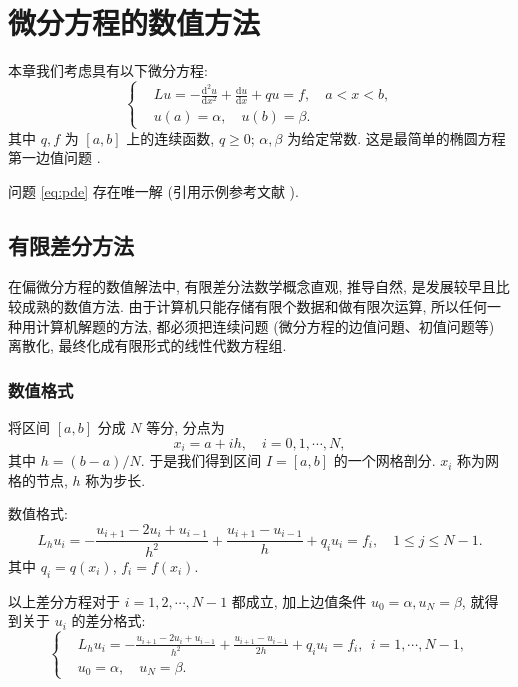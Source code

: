 

\chapter{微分方程的数值方法}

本章我们考虑具有以下微分方程:
\begin{equation}\label{eq:pde}
\left\{\begin{aligned}
& L u=-\frac{\mathrm{d}^{2} u}{\mathrm{d} x^{2}}+\frac{\mathrm{d} u}{\mathrm{d} x}+q u=f, \quad a < x < b, \\
& u(a)=\alpha, \quad u(b)=\beta.
\end{aligned}\right.
\end{equation}
其中 $q, f$ 为 $[a,b]$ 上的连续函数, $q \geqslant 0$; $\alpha, \beta$ 为给定常数. 这是最简单的椭圆方程第一边值问题 .

问题 \eqref{eq:pde} 存在唯一解 (引用示例参考文献 \cite{LiLiu1997}).


\section{有限差分方法}
在偏微分方程的数值解法中, 有限差分法数学概念直观, 推导自然, 是发展较早且比较成熟的数值方法. 由于计算机只能存储有限个数据和做有限次运算, 所以任何一种用计算机解题的方法, 都必须把连续问题 (微分方程的边值问題、初值问题等) 离散化, 最终化成有限形式的线性代数方程组.

\subsection{数值格式}
将区间 $[a,b]$ 分成 $N$ 等分, 分点为
\begin{equation*}
  x_{i}=a+i h, \quad i=0,1, \cdots, N,
\end{equation*}
其中 $h=(b-a) / N$. 于是我们得到区间 $I=[a,b]$ 的一个网格剖分. $x_i$ 称为网格的节点, $h$ 称为步长.

数值格式:
\begin{equation*}
  L_{h} u_{i}=-\frac{u_{i+1}-2 u_{i}+u_{i-1}}{h^{2}}+\frac{u_{i+1}-u_{i-1}}{h}+q_{i} u_{i}=f_{i},\quad 1 \leqslant j \leqslant N-1.
\end{equation*}
其中  $q_{i}=q(x_{i})$, $f_{i}=f(x_{i})$.

以上差分方程对于 $i=1,2, \cdots, N-1$ 都成立, 加上边值条件 $u_{0}=\alpha, u_{N}=\beta$, 就得到关于 $u_i$ 的差分格式:
\begin{equation}\label{eq:fdm}
\left\{\begin{aligned}
& L_{h} u_{i}=-\frac{u_{i+1}-2 u_{i}+u_{i-1}}{h^{2}}+\frac{u_{i+1}-u_{i-1}}{2h}+q_{i} u_{i}=f_{i}, ~~ i=1, \cdots, N-1, \\
& u_{0}=\alpha, \quad u_{N}=\beta.
\end{aligned}\right.
\end{equation}

